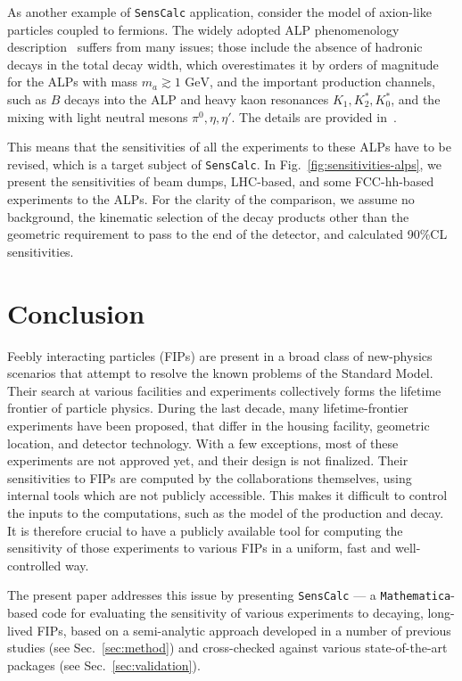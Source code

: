\documentclass[
    aps,prd,
    twocolumn,
    nofootinbib,
    superscriptaddress,
]{revtex4}
\begin{document}
As another example of \texttt{SensCalc} application, consider the model of axion-like particles coupled to fermions. The widely adopted ALP phenomenology description~\cite{Beacham:2019nyx} suffers from many issues; those include the absence of hadronic decays in the total decay width, which overestimates it by orders of magnitude for the ALPs with mass $m_{a}\gtrsim 1\text{ GeV}$, and the important production channels, such as $B$ decays into the ALP and heavy kaon resonances $K_{1},K_{2}^{*},K_{0}^{*}$, and the mixing with light neutral mesons $\pi^{0},\eta,\eta'$. The details are provided in~\cite{DallaValleGarcia:2023xhh}.

This means that the sensitivities of all the experiments to these ALPs have to be revised, which is a target subject of \texttt{SensCalc}. In Fig.~\ref{fig:sensitivities-alps}, we present the sensitivities of beam dumps, LHC-based, and some FCC-hh-based experiments to the ALPs. For the clarity of the comparison, we assume no background, the kinematic selection of the decay products other than the geometric requirement to pass to the end of the detector, and calculated 90\%CL sensitivities. 


\section{Conclusion}
\label{sec:conclusions}
Feebly interacting particles (FIPs) are present in a broad class of new-physics scenarios that attempt to resolve the known problems of the Standard Model. Their search at various facilities and experiments collectively forms the lifetime frontier of particle physics. During the last decade, many lifetime-frontier experiments have been proposed, that differ in the housing facility, geometric location, and detector technology. With a few exceptions, most of these experiments are not approved yet, and their design is not finalized. Their sensitivities to FIPs are computed by the collaborations themselves, using internal tools which are not publicly accessible. This makes it difficult to control the inputs to the computations, such as the model of the production and decay. It is therefore crucial to have a publicly available tool for computing the sensitivity of those experiments to various FIPs in a uniform, fast and well-controlled way.

The present paper addresses this issue by presenting \texttt{SensCalc} --- a \texttt{Mathematica}-based code for evaluating the sensitivity of various experiments to decaying, long-lived FIPs, based on a semi-analytic approach developed in a number of previous studies (see Sec.~\ref{sec:method}) and cross-checked against various state-of-the-art packages (see Sec.~\ref{sec:validation}). 
\end{document}
